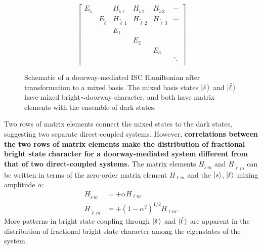 \documentclass[12pt]{mitthesis}
\newcommand{\ts}{\tilde{s}\,}
\newcommand{\tl}{\tilde{\ell}\,}
\begin{document}
\begin{figure}
  \caption{Schematic of a doorway-mediated ISC Hamiltonian after
    transformation to a mixed basis. The mixed basis states
    $\ket{\ts}$ and $\ket{\tl}$ have mixed bright$\sim$doorway
    character, and both have matrix elements with the ensemble of dark
    states.}
  \label{fig:matrix-mixed}
  \begin{equation*}
    \begin{bmatrix}
      E_{\ts} & & H_{\ts 1} & H_{\ts 2} & H_{\ts 3} & \dotsm \\
      & E_{\tl} & H_{\tl 1} & H_{\tl 2} & H_{\tl 3} & \dotsm \\
      & & E_1 \\
      & & & E_2 \\
      & & & & E_3 \\
      & & & & & \ddots \\
    \end{bmatrix}
  \end{equation*}
\end{figure}

Two rows of matrix elements connect the mixed states to the dark
states, suggesting two separate direct-coupled systems. However,
\textbf{correlations between the two rows of matrix elements make the
  distribution of fractional bright state character for a
  doorway-mediated system different from that of two direct-coupled
  systems.}  The matrix elements $H_{\ts m}$ and $H_{\tl m}$ can be
written in terms of the zero-order matrix element $H_{\ell m}$ and the
$\mathinner{|{s}\rangle}$, $\mathinner{|{\ell}\rangle}$ mixing amplitude $\alpha$:
\begin{equation}
  \begin{split}
    H_{\ts m} &= + \alpha H_{\ell m}\\
    H_{\tl m} &= + (1-\alpha^2)^{1/2} H_{\ell m}.
  \end{split}
\end{equation}
More patterns in bright state coupling through $\ket{\ts}$ and
$\ket{\tl}$ are apparent in the distribution of fractional
bright state character among the eigenstates of the system.
\end{document}
